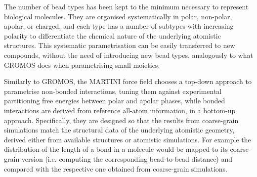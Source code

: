 The number of bead types has been kept to the minimum necessary to represent biological molecules. They are organised systematically in polar, non-polar, apolar, or charged, and each type has a number of subtypes with increasing polarity to differentiate the chemical nature of the underlying atomistic structures.
%
This systematic parametrisation can be easily transferred to new compounds, without the need of introducing new bead types, analogously to what GROMOS does when parametrising small moieties.

Similarly to GROMOS, the MARTINI force field chooses a top-down approach to parametrise non-bonded interactions, tuning them against experimental partitioning free energies between polar and apolar phases, while bonded interactions are derived from reference all-atom information, in a bottom-up approach.
%
Specifically, they are designed so that the results from coarse-grain simulations match the structural data of the underlying atomistic geometry, derived either from available structures or atomistic simulations. For example the distribution of the length of a bond in a molecule would be mapped to its coarse-grain version (i.e. computing the corresponding bead-to-bead distance) and compared with the respective one obtained from coarse-grain simulations.

